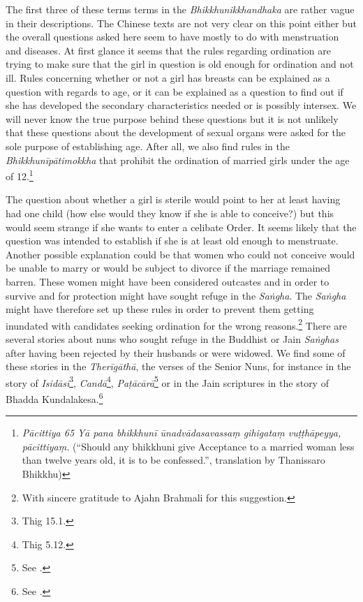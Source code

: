 The first three of these terms terms in the {\em Bhikkhunikkhandhaka} are rather vague in their descriptions. The Chinese texts are not very clear on this point either but the overall questions asked here seem to have mostly to do with menstruation and diseases. At first glance it seems that the rules regarding ordination are trying to make sure that the girl in question is old enough for ordination and not ill. Rules concerning whether or not a girl has breasts can be explained as a question with regards to age, or it can be explained as a question to find out if she has developed the secondary characteristics needed or is possibly intersex. We will never know the true purpose behind these questions but it is not unlikely that these questions about the development of sexual organs were asked for the sole purpose of establishing age. After all, we also find rules in the {\em Bhikkhunīpātimokkha} that prohibit the ordination of married girls under the age of 12.\footnote{{\em Pācittiya 65 Yā pana bhikkhunī ūnad­vāda­sa­vassaṃ gihigataṃ vuṭṭhāpeyya, pācittiyaṃ.} (``Should any bhikkhuni give Acceptance to a married woman less than twelve years old, it is to be confessed.'', translation by Thanissaro Bhikkhu)} 

The question about whether a girl is sterile would point to her at least having had one child (how else would they know if she is able to conceive?) but this would seem strange if she wants to enter a celibate Order. It seems likely that the question was intended to establish if she is at least old enough to menstruate. Another possible explanation could be that women who could not conceive would be unable to marry or would be subject to divorce if the marriage remained barren. These women might have been considered outcastes and in order to survive and for protection might have sought refuge in the {\em Saṅgha}. The {\em Saṅgha} might have therefore set up these rules in order to prevent them getting inundated with candidates seeking ordination for the wrong reasons.\footnote{With sincere gratitude to Ajahn Brahmali for this suggestion.} There are several stories about nuns who sought refuge in the Buddhist or Jain {\em Saṅghas} after having been rejected by their husbands or were widowed. We find some of these stories in the {\em Therīgāthā}, the verses of the Senior Nuns, for instance in the story of {\em Isidāsī}\footnote{Thig 15.1.}, {\em Candā}\footnote{Thig 5.12.}, {\em Paṭācārā}\footnote{See \cite{hecker}.} or in the Jain scriptures in the story of Bhadda Kundalakesa.\footnote{See \cite{hecker}.}

